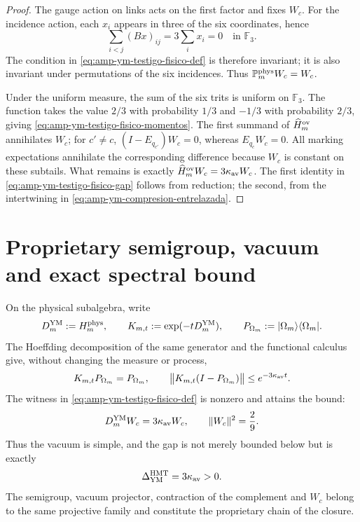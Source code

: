 \begin{proof}
The gauge action on links acts on the first factor and fixes
\(W_c\). For the incidence action, each \(x_i\) appears in three of the
six coordinates, hence
\[
 \sum_{i<j}(Bx)_{ij}=3\sum_i x_i=0
 \quad\text{in }\mathbb F_3.
\]
The condition in \eqref{eq:amp-ym-testigo-fisico-def} is therefore
invariant; it is also invariant under permutations of the six incidences.
Thus \(\mathbb P_m^{\rm phys}W_c=W_c\).

Under the uniform measure, the sum of the six trits is uniform on
\(\mathbb F_3\). The function takes the value \(2/3\) with probability \(1/3\)
and \(-1/3\) with probability \(2/3\), giving
\eqref{eq:amp-ym-testigo-fisico-momentos}. The first summand of
\(\widehat H_m^{\rm ov}\) annihilates \(W_c\); for \(c'\ne c\),
\((I-E_{q_{c'}})W_c=0\), whereas
\(E_{q_c}W_c=0\). All marking expectations annihilate the
corresponding difference because \(W_c\) is constant on these subtails.
What remains is exactly
\(\widehat H_m^{\rm ov}W_c=3\kappa_{\rm av}W_c\). The first identity in
\eqref{eq:amp-ym-testigo-fisico-gap} follows from reduction; the second,
from the intertwining in \eqref{eq:amp-ym-compresion-entrelazada}.
\end{proof}

\section*{Proprietary semigroup, vacuum and exact spectral bound}

On the physical subalgebra, write
\[
 D_m^{\rm YM}:=H_m^{\rm phys},\qquad
 K_{m,t}:=\exp(-tD_m^{\rm YM}),\qquad
 P_{\Omega_m}:=|\Omega_m\rangle\langle\Omega_m|.
\]
The Hoeffding decomposition of the same generator and the functional calculus
give, without changing the measure or process,
\begin{equation}\label{eq:amp-ym-owner-semigrupo-vacio}
 K_{m,t}P_{\Omega_m}=P_{\Omega_m},
 \qquad
 \bigl\|K_{m,t}(I-P_{\Omega_m})\bigr\|
 \leq e^{-3\kappa_{\rm av}t}.
\end{equation}
The witness in \eqref{eq:amp-ym-testigo-fisico-def} is nonzero and attains the
bound:
\begin{equation}\label{eq:amp-ym-owner-testigo-wc}
 D_m^{\rm YM}W_c=3\kappa_{\rm av}W_c,
 \qquad \|W_c\|^2=\frac29.
\end{equation}
Thus the vacuum is simple, and the gap is not merely bounded below
but is exactly
\begin{equation}\label{eq:amp-ym-owner-brecha-exacta}
 \Delta_{\rm YM}^{\rm HMT}=3\kappa_{\rm av}>0.
\end{equation}
The semigroup, vacuum projector, contraction of the complement and
\(W_c\) belong to the same projective family and constitute the
proprietary chain of the closure.

